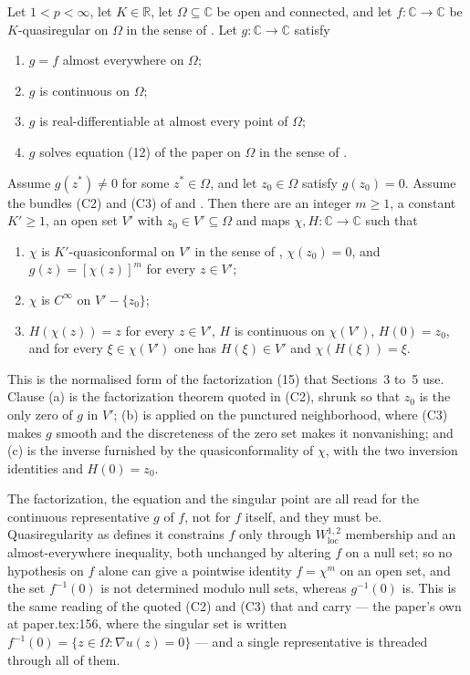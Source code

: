 \begin{lemma}
Let $1<p<\infty$, let $K\in\mathbb{R}$, let $\Omega\subseteq\mathbb{C}$ be open
and connected, and let $f\colon\mathbb{C}\to\mathbb{C}$ be $K$-quasiregular on
$\Omega$ in the sense of .  Let
$g\colon\mathbb{C}\to\mathbb{C}$ satisfy
\begin{enumerate}
\item[(i)] $g=f$ almost everywhere on $\Omega$;
\item[(ii)] $g$ is continuous on $\Omega$;
\item[(iii)] $g$ is real-differentiable at almost every point of $\Omega$;
\item[(iv)] $g$ solves equation (12) of the paper on $\Omega$ in the sense of
  .
\end{enumerate}
Assume $g(z^{*})\neq0$ for some $z^{*}\in\Omega$, and let $z_0\in\Omega$
satisfy $g(z_0)=0$.  Assume the bundles (C2) and (C3) of 
and .  Then there
are an integer $m\ge1$, a constant $K'\ge1$, an open set $V'$ with
$z_0\in V'\subseteq\Omega$ and maps $\chi,H\colon\mathbb{C}\to\mathbb{C}$ such
that
\begin{enumerate}
\item[(a)] $\chi$ is $K'$-quasiconformal on $V'$ in the sense of
  , $\chi(z_0)=0$, and $g(z)=[\chi(z)]^{m}$ for every
  $z\in V'$;
\item[(b)] $\chi$ is $C^\infty$ on $V'-\{z_0\}$;
\item[(c)] $H(\chi(z))=z$ for every $z\in V'$, $H$ is continuous on
  $\chi(V')$, $H(0)=z_0$, and for every $\xi\in\chi(V')$ one has
  $H(\xi)\in V'$ and $\chi(H(\xi))=\xi$.
\end{enumerate}

This is the normalised form of the factorization (15) that Sections~3 to~5
use.  Clause (a) is the factorization theorem quoted in (C2), shrunk so that
$z_0$ is the only zero of $g$ in $V'$; (b) is 
applied on the punctured neighborhood, where (C3) makes $g$ smooth and the
discreteness of the zero set makes it nonvanishing; and (c) is the inverse
furnished by the quasiconformality of $\chi$, with the two inversion
identities and $H(0)=z_0$.

The factorization, the equation and the singular point are all read for the
continuous representative $g$ of $f$, not for $f$ itself, and they must be.
Quasiregularity as  defines it constrains $f$ only
through $W^{1,2}_{\mathrm{loc}}$ membership and an almost-everywhere
inequality, both unchanged by altering $f$ on a null set; so no hypothesis on
$f$ alone can give a pointwise identity $f=\chi^{m}$ on an open set, and the
set $f^{-1}(0)$ is not determined modulo null sets, whereas $g^{-1}(0)$ is.
This is the same reading of the quoted (C2) and (C3) that 
and  carry --- the paper's own at paper.tex:156, where
the singular set is written $f^{-1}(0)=\{z\in\Omega:\nabla u(z)=0\}$ --- and a
single representative is threaded through all of them.


\end{lemma}
